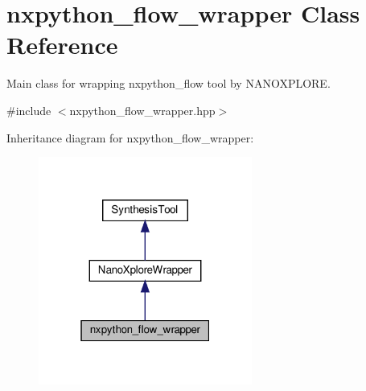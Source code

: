 \hypertarget{classnxpython__flow__wrapper}{}\section{nxpython\+\_\+flow\+\_\+wrapper Class Reference}
\label{classnxpython__flow__wrapper}


Main class for wrapping nxpython\+\_\+flow tool by N\+A\+N\+O\+X\+P\+L\+O\+RE.  




{\ttfamily \#include $<$nxpython\+\_\+flow\+\_\+wrapper.\+hpp$>$}



Inheritance diagram for nxpython\+\_\+flow\+\_\+wrapper\+:
\nopagebreak
\begin{figure}[H]
\begin{center}
\leavevmode
\includegraphics[width=199pt]{d9/d64/classnxpython__flow__wrapper__inherit__graph}
\end{center}
\end{figure}


